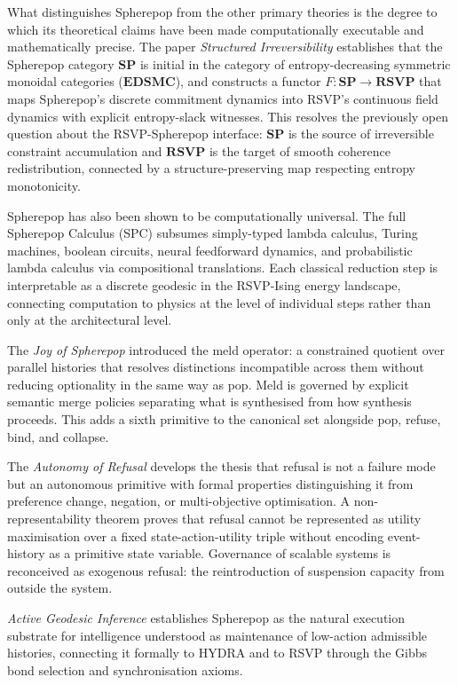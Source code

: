 \documentclass[12pt, twoside]{article}
\begin{document}
What distinguishes Spherepop from the other primary theories is the degree
to which its theoretical claims have been made computationally executable
and mathematically precise. The paper \emph{Structured Irreversibility}
establishes that the Spherepop category $\mathbf{SP}$ is initial in the
category of entropy-decreasing symmetric monoidal categories
($\mathbf{EDSMC}$), and constructs a functor $F: \mathbf{SP} \to
\mathbf{RSVP}$ that maps Spherepop's discrete commitment dynamics into
RSVP's continuous field dynamics with explicit entropy-slack witnesses.
This resolves the previously open question about the RSVP-Spherepop
interface: $\mathbf{SP}$ is the source of irreversible constraint
accumulation and $\mathbf{RSVP}$ is the target of smooth coherence
redistribution, connected by a structure-preserving map respecting entropy
monotonicity.

Spherepop has also been shown to be computationally universal. The full
Spherepop Calculus (SPC) subsumes simply-typed lambda calculus, Turing
machines, boolean circuits, neural feedforward dynamics, and probabilistic
lambda calculus via compositional translations. Each classical reduction
step is interpretable as a discrete geodesic in the RSVP-Ising energy
landscape, connecting computation to physics at the level of individual
steps rather than only at the architectural level.

The \emph{Joy of Spherepop} introduced the meld operator: a constrained
quotient over parallel histories that resolves distinctions incompatible
across them without reducing optionality in the same way as pop. Meld is
governed by explicit semantic merge policies separating what is synthesised
from how synthesis proceeds. This adds a sixth primitive to the canonical
set alongside pop, refuse, bind, and collapse.

The \emph{Autonomy of Refusal} develops the thesis that refusal is not a
failure mode but an autonomous primitive with formal properties
distinguishing it from preference change, negation, or
multi-objective optimisation. A non-representability theorem proves that
refusal cannot be represented as utility maximisation over a fixed
state-action-utility triple without encoding event-history as a primitive
state variable. Governance of scalable systems is reconceived as
exogenous refusal: the reintroduction of suspension capacity from outside
the system.

\emph{Active Geodesic Inference} establishes Spherepop as the natural
execution substrate for intelligence understood as maintenance of low-action
admissible histories, connecting it formally to HYDRA and to RSVP through
the Gibbs bond selection and synchronisation axioms.
\end{document}
